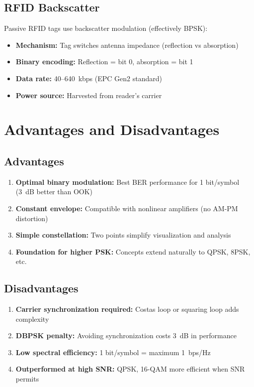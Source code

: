 \subsection{RFID Backscatter}

Passive RFID tags use backscatter modulation (effectively BPSK):
\begin{itemize}
\item \textbf{Mechanism:} Tag switches antenna impedance (reflection vs absorption)
\item \textbf{Binary encoding:} Reflection = bit 0, absorption = bit 1
\item \textbf{Data rate:} 40--640~kbps (EPC Gen2 standard)
\item \textbf{Power source:} Harvested from reader's carrier
\end{itemize}

\section{Advantages and Disadvantages}

\subsection*{Advantages}

\begin{enumerate}
\item \textbf{Optimal binary modulation:} Best BER performance for 1 bit/symbol (3~dB better than OOK)
\item \textbf{Constant envelope:} Compatible with nonlinear amplifiers (no AM-PM distortion)
\item \textbf{Simple constellation:} Two points simplify visualization and analysis
\item \textbf{Foundation for higher PSK:} Concepts extend naturally to QPSK, 8PSK, etc.
\end{enumerate}

\subsection*{Disadvantages}

\begin{enumerate}
\item \textbf{Carrier synchronization required:} Costas loop or squaring loop adds complexity
\item \textbf{DBPSK penalty:} Avoiding synchronization costs 3~dB in performance
\item \textbf{Low spectral efficiency:} 1 bit/symbol = maximum 1~bps/Hz
\item \textbf{Outperformed at high SNR:} QPSK, 16-QAM more efficient when SNR permits
\end{enumerate}

